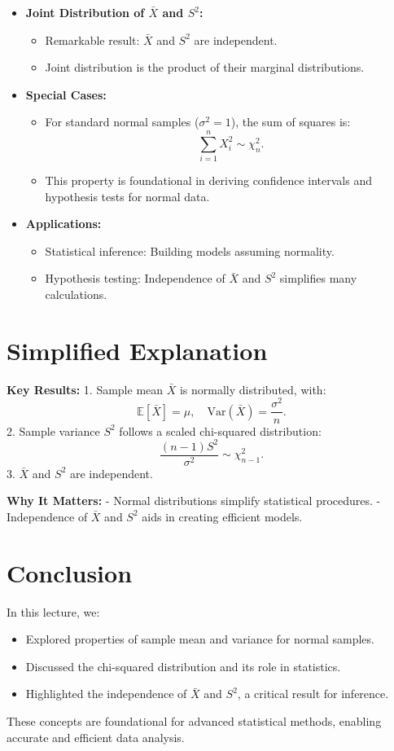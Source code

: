 \documentclass{article}
\begin{document}
\begin{itemize}
  \item \textbf{Joint Distribution of $\bar{X}$ and $S^2$:}
    \begin{itemize}
      \item Remarkable result: $\bar{X}$ and $S^2$ are independent.
      \item Joint distribution is the product of their marginal distributions.
    \end{itemize}

  \item \textbf{Special Cases:}
    \begin{itemize}
      \item For standard normal samples ($\sigma^2 = 1$), the sum of squares is:
        \[
          \sum_{i=1}^n X_i^2 \sim \chi^2_n.
        \]
      \item This property is foundational in deriving confidence intervals and hypothesis tests for normal data.
    \end{itemize}

  \item \textbf{Applications:}
    \begin{itemize}
      \item Statistical inference: Building models assuming normality.
      \item Hypothesis testing: Independence of $\bar{X}$ and $S^2$ simplifies many calculations.
    \end{itemize}
\end{itemize}

\section*{Simplified Explanation}

\textbf{Key Results:}
1. Sample mean $\bar{X}$ is normally distributed, with:
\[
  \mathbb{E}[\bar{X}] = \mu, \quad \text{Var}(\bar{X}) = \frac{\sigma^2}{n}.
\]
2. Sample variance $S^2$ follows a scaled chi-squared distribution:
\[
  \frac{(n-1)S^2}{\sigma^2} \sim \chi^2_{n-1}.
\]
3. $\bar{X}$ and $S^2$ are independent.

\textbf{Why It Matters:}
- Normal distributions simplify statistical procedures.
- Independence of $\bar{X}$ and $S^2$ aids in creating efficient models.

\section*{Conclusion}

In this lecture, we:
\begin{itemize}
  \item Explored properties of sample mean and variance for normal samples.
  \item Discussed the chi-squared distribution and its role in statistics.
  \item Highlighted the independence of $\bar{X}$ and $S^2$, a critical result for inference.
\end{itemize}

These concepts are foundational for advanced statistical methods, enabling accurate and efficient data analysis.
\end{document}
